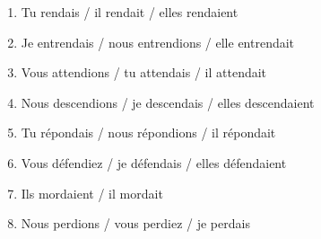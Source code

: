 \begin{enumerate}
    \item Tu rendais / il rendait / elles rendaient
    \item Je entrendais / nous entrendions / elle entrendait
    \item Vous attendions / tu attendais / il attendait
    \item Nous descendions / je descendais / elles descendaient
    \item Tu répondais / nous répondions / il répondait
    \item Vous défendiez / je défendais / elles défendaient
    \item Ils mordaient / il mordait 
    \item Nous perdions / vous perdiez / je perdais
\end{enumerate}